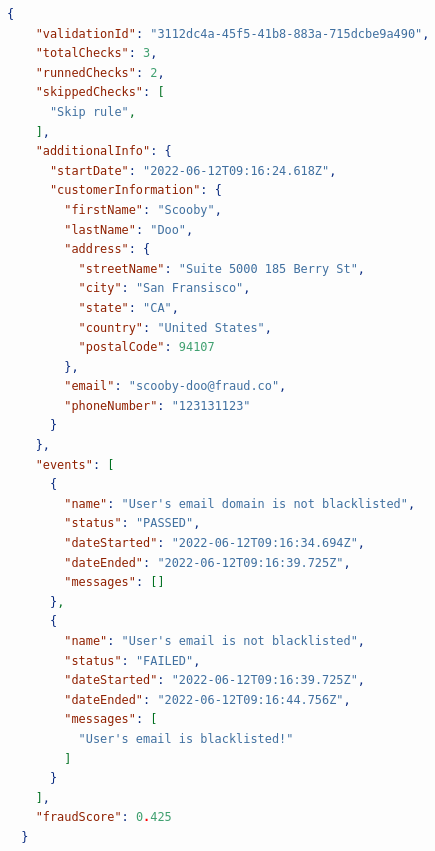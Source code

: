     \begin{lstlisting}[caption={Validation result example (JSON)}, language=json]
  {
    "validationId": "3112dc4a-45f5-41b8-883a-715dcbe9a490",
    "totalChecks": 3,
    "runnedChecks": 2,
    "skippedChecks": [
      "Skip rule",
    ],
    "additionalInfo": {
      "startDate": "2022-06-12T09:16:24.618Z",
      "customerInformation": {
        "firstName": "Scooby",
        "lastName": "Doo",
        "address": {
          "streetName": "Suite 5000 185 Berry St",
          "city": "San Fransisco",
          "state": "CA",
          "country": "United States",
          "postalCode": 94107
        },
        "email": "scooby-doo@fraud.co",
        "phoneNumber": "123131123"
      }
    },
    "events": [
      {
        "name": "User's email domain is not blacklisted",
        "status": "PASSED",
        "dateStarted": "2022-06-12T09:16:34.694Z",
        "dateEnded": "2022-06-12T09:16:39.725Z",
        "messages": []
      },
      {
        "name": "User's email is not blacklisted",
        "status": "FAILED",
        "dateStarted": "2022-06-12T09:16:39.725Z",
        "dateEnded": "2022-06-12T09:16:44.756Z",
        "messages": [
          "User's email is blacklisted!"
        ]
      }
    ],
    "fraudScore": 0.425  
  }
    \end{lstlisting}